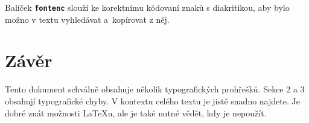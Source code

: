 \documentclass[a4paper,10pt,twocolumn]{article}
\begin{document}
Balíček \texttt{\textbf{fontenc}} slouží ke korektnímu kódovaní znaků s diakritikou, aby bylo možno v textu vyhledávat a~kopírovat z něj.

\section{Závěr}

Tento dokument schválně obsahuje několik typografických prohřešků. Sekce 2 a 3 obsahují typografické chyby. V kontextu celého textu je jistě snadno najdete. Je dobré znát možnosti \LaTeX u, ale je také nutné vědět, kdy je nepoužít.
\end{document}
